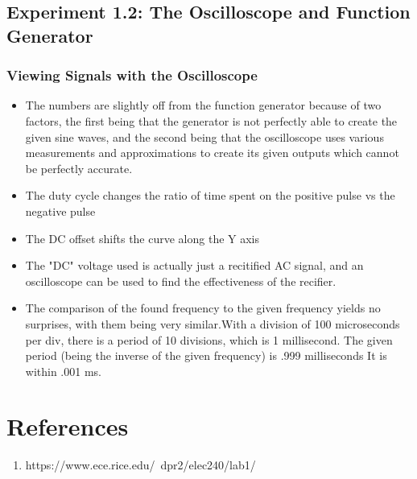 \documentclass[10pt]{article}
\begin{document}
	\subsection{Experiment 1.2: The Oscilloscope and Function Generator}
	\subsubsection{Viewing Signals with the Oscilloscope}
	\begin{itemize}
	\item The numbers are slightly off from the function generator because of two factors, the first being that the generator is not perfectly able to create the given sine waves, and the second being that the oscilloscope uses various measurements and approximations to create its given outputs which cannot be perfectly accurate.
	\item The duty cycle changes the ratio of time spent on the positive pulse vs the negative pulse
	\item The DC offset shifts the curve along the Y axis
	\item The "DC" voltage used is actually just a recitified AC signal, and an oscilloscope can be used to find the effectiveness of the recifier.
	\item The comparison of the found frequency to the given frequency yields no surprises, with them being very similar.With a division of 100 microseconds per div, there is a period of 10 divisions, which is 1 millisecond. The given period (being the inverse of the given frequency) is .999 milliseconds It is within .001 ms.

	\end{itemize}

	\medskip
	
	
	\section{References}
	
	\begin{enumerate}
		\item https://www.ece.rice.edu/~dpr2/elec240/lab1/
	\end{enumerate}
	
\end{document}
